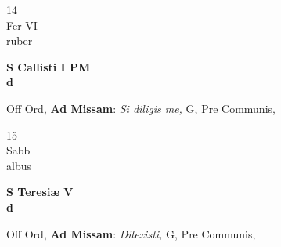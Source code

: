\documentclass[10pt, openany]{book}
\begin{document}
        \begin{center}
            \begin{minipage}{3.5in}
                \vspace{2em}
                \begin{minipage}{0.5in}
                    {\Huge 14} \\
                    {\normalsize Fer VI} \\
                    {\normalsize ruber}
                \end{minipage}
                \begin{minipage}{3.0in}
                    \textbf{ \large S Callisti I PM \\
                    \textnormal{\normalsize d}} \\ 
                \end{minipage}
                \begin{justify}Off Ord, \textbf{Ad Missam}: \textit{Si diligis me,} G, Pre Communis,  
                \end{justify}
            \end{minipage}
        \end{center}
    
        \begin{center}
            \begin{minipage}{3.5in}
                \vspace{2em}
                \begin{minipage}{0.5in}
                    {\Huge 15} \\
                    {\normalsize Sabb} \\
                    {\normalsize albus}
                \end{minipage}
                \begin{minipage}{3.0in}
                    \textbf{ \large S Teresiæ V \\
                    \textnormal{\normalsize d}} \\ 
                \end{minipage}
                \begin{justify}Off Ord, \textbf{Ad Missam}: \textit{Dilexisti,} G, Pre Communis,  
                \end{justify}
            \end{minipage}
        \end{center}
    
\end{document}
